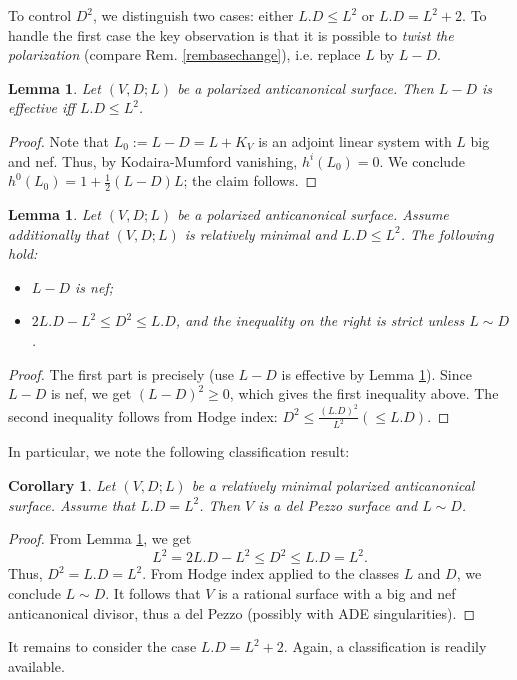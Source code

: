 \documentclass{amsart}
\numberwithin{equation}{section}
\theoremstyle{plain}
\newtheorem{lemma}[equation]{Lemma}
\newtheorem{corollary}[equation]{Corollary}
\theoremstyle{remark}
\theoremstyle{definition}
\begin{document}
To control $D^2$, we distinguish two cases: either $L.D\le L^2$ or $L.D=L^2+2$. To handle the first case the key observation is that it is possible to {\it twist  the polarization} (compare Rem. \ref{rembasechange}), i.e. replace $L$ by $L-D$. 
\begin{lemma}\label{lemtwist}
Let $(V,D;L)$ be a polarized anticanonical surface. Then $L-D$ is effective iff $L.D\le L^2$.  
\end{lemma}
\begin{proof}
Note that $L_0:=L-D=L+K_V$ is an adjoint linear system with $L$ big and nef. Thus, by Kodaira-Mumford vanishing,  $h^i(L_0)=0$. We conclude $h^0(L_0)=1+\frac{1}{2}(L-D)L$; the claim follows.
\end{proof}
\begin{lemma}\label{lbound2}
Let $(V,D;L)$ be a polarized anticanonical surface. Assume additionally that $(V,D;L)$ is relatively minimal and $L.D\le L^2$. The following hold:
\begin{itemize}
\item[i)] $L-D$ is nef;
\item[ii)] $2L.D-L^2\le D^2\le L.D$, and the inequality on the right is strict unless $L\sim D$. 
\end{itemize}
\end{lemma}
\begin{proof}
The first part is precisely \cite[Lem. III.9(c)]{har1} (use $L-D$ is effective by Lemma \ref{lemtwist}). Since $L-D$ is nef, we get $(L-D)^2\ge 0$, which gives the first inequality above. The second inequality follows from Hodge index: $D^2\le \frac{(L.D)^2}{L^2}\left (\le L.D \right)$.  
\end{proof}
In particular, we note the following classification result:
\begin{corollary}\label{cordp}
Let $(V,D;L)$ be a relatively minimal polarized anticanonical surface. Assume that $L.D=L^2$. Then $V$ is a del Pezzo surface and $L\sim D$. 
\end{corollary}
\begin{proof}
From Lemma \ref{lbound2}, we get 
$$L^2=2L.D-L^2\le D^2\le L.D=L^2.$$
Thus, $D^2=L.D=L^2$. From Hodge index  applied to the classes $L$ and $D$, we conclude $L\sim D$. It follows that $V$ is a rational surface with a big and nef anticanonical divisor, thus a del Pezzo (possibly with ADE singularities). 
\end{proof}


It remains to consider the case $L.D=L^2+2$. Again, a classification is readily available. 
\end{document}
